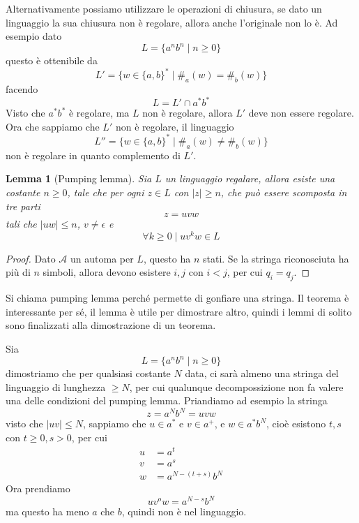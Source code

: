 \documentclass[12pt]{article}
\newtheorem{lemma}{Lemma}
\begin{document}
Alternativamente possiamo utilizzare le operazioni di chiusura, se dato un linguaggio la sua chiusura non è regolare, allora anche l'originale non lo è.
Ad esempio dato 
$$ L = \{a^n b^n \mid n \geq 0 \} $$
questo è ottenibile da
$$ L' = \{ w \in \{a, b\}^* \mid \#_a(w) = \#_b(w) \} $$
facendo
$$ L = L' \cap a^* b^* $$
Visto che $a^* b^*$ è regolare, ma $L$ non è regolare, allora $L'$ deve non essere regolare.
Ora che sappiamo che $L'$ non è regolare, il linguaggio
$$ L'' = \{ w \in \{a, b\}^* \mid \#_a(w) \neq \#_b(w) \} $$
non è regolare in quanto complemento di $L'$.

\begin{lemma}[Pumping lemma]
	Sia $L$ un linguaggio regalare, allora esiste una costante $n \geq 0$, tale che per ogni $z \in L$ con $|z| \geq n$, che può essere scomposta in tre parti
	$$ z = u v w $$
	tali che $ |uw| \leq n$, $v \neq \epsilon$ e 
	$$\forall k \geq 0 \mid u v^k w \in L $$ 
\end{lemma}
\begin{proof}
	Dato $\mathcal{A}$ un automa per $L$, questo ha $n$ stati.
	Se la stringa riconosciuta ha più di $n$ simboli, allora devono esistere $i, j$ con $i < j$, per cui $q_i = q_j$.
\end{proof}
Si chiama pumping lemma perché permette di gonfiare una stringa.
Il teorema è interessante per sé, il lemma è utile per dimostrare altro, quindi i lemmi di solito sono finalizzati alla dimostrazione di un teorema.

\begin{tcolorbox}
	Sia
	$$ L = \{a^n b^n \mid n \geq 0 \} $$
	dimostriamo che per qualsiasi costante $N$ data, ci sarà almeno una stringa del linguaggio di lunghezza $\geq N$, per cui qualunque decompossizione non fa valere una delle condizioni del pumping lemma.
	Priandiamo ad esempio la stringa
	$$ z = a^N b^N = u v w $$
	visto che $|uv| \leq N$, sappiamo che $u \in a^*$ e $v \in a^+$, e $w \in a^* b^N$, cioè esistono $t, s$ con $t \geq 0, s > 0$, per cui
	\begin{align*}
		u &= a^t \\
		v &= a^s \\
		w &= a^{N - (t + s)} b^N 
	\end{align*}
	Ora prendiamo 
	$$ u v^o w = a^{N - s} b^N $$
	ma questo ha meno $a$ che $b$, quindi non è nel linguaggio.
\end{tcolorbox}
\end{document}
